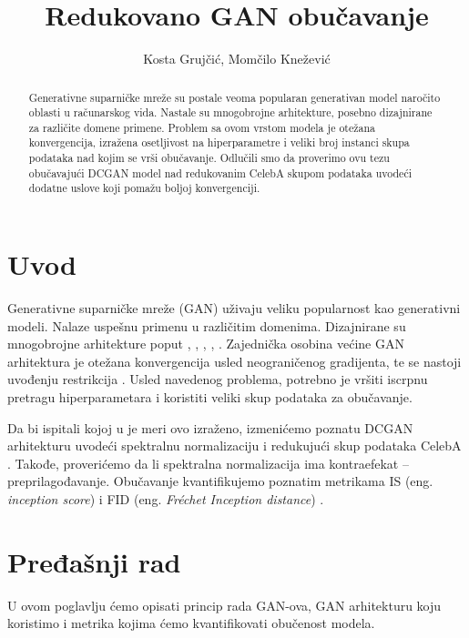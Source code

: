 \documentclass[12pt, a4paper]{article}
\begin{document}
\date{}
\title{Redukovano GAN obučavanje}
\author{Kosta Grujčić, Momčilo Knežević}
\maketitle

\begin{abstract}
Generativne suparničke mreže su postale veoma popularan generativan model naročito oblasti u računarskog vida. Nastale su mnogobrojne arhitekture, posebno dizajnirane za različite domene primene. Problem sa ovom vrstom modela je otežana konvergencija, izražena osetljivost na hiperparametre i veliki broj instanci skupa podataka nad kojim se vrši obučavanje. Odlučili smo da proverimo ovu tezu obučavajući DCGAN model nad redukovanim CelebA skupom podataka uvodeći dodatne uslove koji pomažu boljoj konvergenciji.
\end{abstract}

\section{Uvod}
Generativne suparničke mreže (GAN) \cite{GAN-2014} uživaju veliku popularnost kao generativni modeli. Nalaze uspešnu primenu u različitim domenima. Dizajnirane su mnogobrojne arhitekture poput \cite{DCGAN-2016}, \cite{WGAN-2017}, \cite{CGAN-2014}, \cite{StyleGAN-2018}, \cite{StyleGAN2-2019}. Zajednička osobina većine GAN arhitektura je otežana konvergencija usled neograničenog gradijenta, te se nastoji uvođenju restrikcija \cite{Lipschitz-2017}. Usled navedenog problema, potrebno je vršiti iscrpnu pretragu hiperparametara i koristiti veliki skup podataka za obučavanje.

Da bi ispitali kojoj u je meri ovo izraženo, izmenićemo poznatu DCGAN arhitekturu uvodeći spektralnu normalizaciju \cite{SN-2018} i redukujući skup podataka CelebA \cite{CelebA-2015}. Takođe, proverićemo da li spektralna normalizacija ima kontraefekat -- preprilagođavanje. Obučavanje kvantifikujemo poznatim metrikama IS (eng. \textit{inception score}) \cite{IS-2016} i FID (eng. \textit{Fréchet Inception distance}) \cite{FID-2017}.

\section{Pređašnji rad}
U ovom poglavlju ćemo opisati princip rada GAN-ova, GAN arhitekturu koju koristimo i metrika kojima ćemo kvantifikovati obučenost modela.
\end{document}

